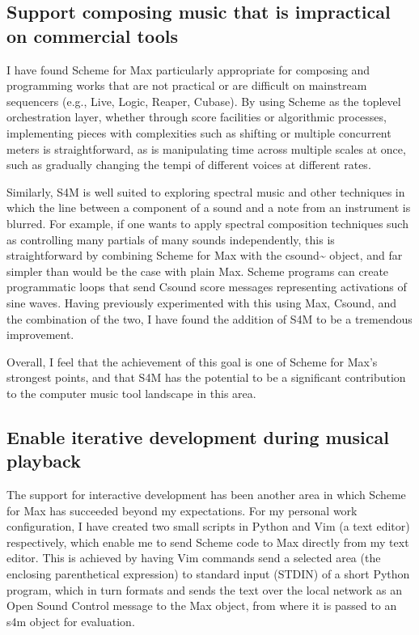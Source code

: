 \documentclass[letterpaper,10pt,english]{sphinxmanual}
\begin{document}
\subsection{Support composing music that is impractical on commercial tools}
\label{\detokenize{conclusion:support-composing-music-that-is-impractical-on-commercial-tools}}
\sphinxAtStartPar
I have found Scheme for Max particularly appropriate for composing and programming works that are
not practical or are difficult on mainstream sequencers (e.g., Live, Logic, Reaper, Cubase).
By using Scheme as the top\sphinxhyphen{}level orchestration layer, whether through score facilities
or algorithmic processes, implementing pieces with complexities such as shifting or multiple concurrent
meters is straightforward, as is manipulating time across multiple scales at once, such as gradually
changing the tempi of different voices at different rates.

\sphinxAtStartPar
Similarly, S4M is well suited to exploring spectral music and other techniques in which the line between a
component of a sound and a note from an instrument is blurred. For example, if one wants to apply spectral composition
techniques such as controlling many partials of many sounds independently, this is straightforward by combining
Scheme for Max with the csound\textasciitilde{} object, and far simpler than would be the case with plain Max.
Scheme programs can create programmatic loops that send Csound score messages representing activations
of sine waves. Having previously experimented with this using Max, Csound, and the combination of the two, I have
found the addition of S4M to be a tremendous improvement.

\sphinxAtStartPar
Overall, I feel that the achievement of this goal is one of Scheme for Max’s strongest points,
and that S4M has the potential to be a significant contribution to the computer music tool landscape
in this area.


\subsection{Enable iterative development during musical playback}
\label{\detokenize{conclusion:enable-iterative-development-during-musical-playback}}
\sphinxAtStartPar
The support for interactive development has been another area in which Scheme for Max has succeeded beyond
my expectations.
For my personal work configuration, I have created two small scripts in Python and Vim (a text editor) respectively,
which enable me to send Scheme code to Max directly from my text editor.
This is achieved by having Vim commands send a selected area (the enclosing parenthetical expression)
to standard input (STDIN) of a short Python program, which in turn formats and sends the text over the local
network as an Open Sound Control message to the Max  object, from where it is passed
to an s4m object for evaluation.
\end{document}

